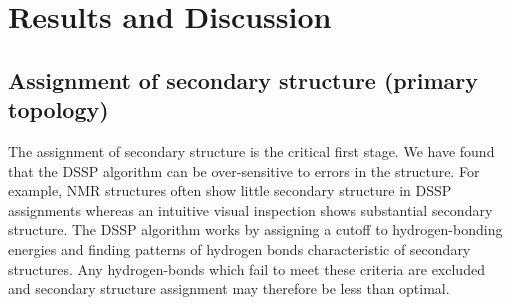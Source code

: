\documentclass{article}
\begin{document}


\section{Results and Discussion}
%
%
%
%

\subsection{Assignment of secondary structure (primary topology)}
The assignment of secondary structure is the critical first stage. We
have found that the DSSP algorithm\cite{kabsch:dictionary} can be
over-sensitive to errors in the structure. For example, NMR structures
often show little secondary structure in DSSP assignments whereas an
intuitive visual inspection shows substantial secondary structure. The
DSSP algorithm works by assigning a cutoff to hydrogen-bonding
energies and finding patterns of hydrogen bonds characteristic of
secondary structures. Any hydrogen-bonds which fail to meet these
criteria are excluded and secondary structure assignment may therefore
be less than optimal.
\end{document}
